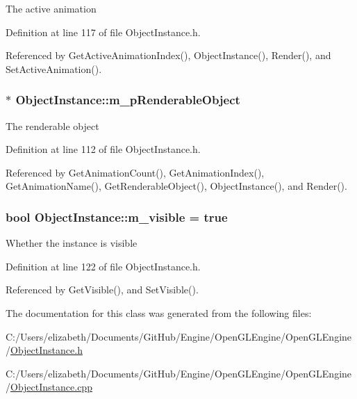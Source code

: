 The active animation 



Definition at line 117 of file Object\+Instance.\+h.



Referenced by Get\+Active\+Animation\+Index(), Object\+Instance(), Render(), and Set\+Active\+Animation().

\subsubsection[{\texorpdfstring{m\+\_\+p\+Renderable\+Object}{m_pRenderableObject}}]{$\ast$ Object\+Instance\+::m\+\_\+p\+Renderable\+Object\hspace{0.3cm}{\ttfamily [private]}}\hypertarget{class_object_instance_a67070bfa6058a31558b406be673df000}{}\label{class_object_instance_a67070bfa6058a31558b406be673df000}


The renderable object 



Definition at line 112 of file Object\+Instance.\+h.



Referenced by Get\+Animation\+Count(), Get\+Animation\+Index(), Get\+Animation\+Name(), Get\+Renderable\+Object(), Object\+Instance(), and Render().

\subsubsection[{\texorpdfstring{m\+\_\+visible}{m_visible}}]{\setlength{\rightskip}{0pt plus 5cm}bool Object\+Instance\+::m\+\_\+visible = true\hspace{0.3cm}{\ttfamily [private]}}\hypertarget{class_object_instance_a42b286c70cd268899841162e35b854e1}{}\label{class_object_instance_a42b286c70cd268899841162e35b854e1}


Whether the instance is visible 



Definition at line 122 of file Object\+Instance.\+h.



Referenced by Get\+Visible(), and Set\+Visible().



The documentation for this class was generated from the following files\+:\begin{DoxyCompactItemize}
\item 
C\+:/\+Users/elizabeth/\+Documents/\+Git\+Hub/\+Engine/\+Open\+G\+L\+Engine/\+Open\+G\+L\+Engine/\hyperlink{_object_instance_8h}{Object\+Instance.\+h}\item 
C\+:/\+Users/elizabeth/\+Documents/\+Git\+Hub/\+Engine/\+Open\+G\+L\+Engine/\+Open\+G\+L\+Engine/\hyperlink{_object_instance_8cpp}{Object\+Instance.\+cpp}\end{DoxyCompactItemize}
